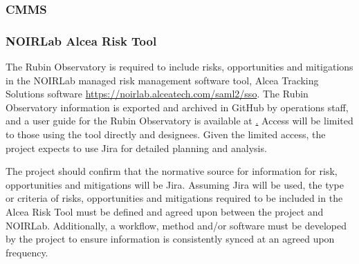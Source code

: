 \subsubsection{CMMS}



\subsubsection{NOIRLab Alcea Risk Tool}

The Rubin Observatory is required to include risks, opportunities and mitigations in the NOIRLab managed risk management software tool, Alcea Tracking Solutions software \url{https://noirlab.alceatech.com/saml2/sso}.
The Rubin Observatory information is exported and archived in GitHub by operations staff, and a user guide for the Rubin Observatory is available at \href{https://rtn-051.lsst.io/}.
Access will be limited to those using the tool directly and designees.
Given the limited access, the project expects to use Jira for detailed planning and analysis.

The project should confirm that the normative source for information for risk, opportunities and mitigations will be Jira.
Assuming Jira will be used, the type or criteria of risks, opportunities and mitigations required to be included in the Alcea Risk Tool must be defined and agreed upon between the project and NOIRLab.
Additionally, a workflow, method and/or software must be developed by the project to ensure information is consistently synced at an agreed upon frequency.
